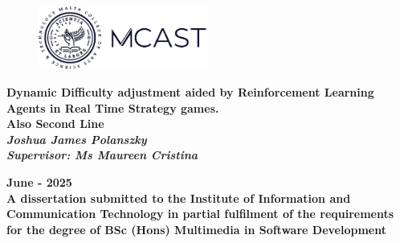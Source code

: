 \begin{titlepage}

\begin{figure}[h!]
\centering
\includegraphics[width=0.5\textwidth, right]{Figures/logo.png}
\caption*{}
\label{fig:entropy} 
\end{figure}

\vspace{0.5in}

\centering
\Huge{\textbf{Dynamic Difficulty adjustment aided by Reinforcement Learning Agents in Real Time Strategy games. \\Also Second Line}}\\[2.0in]

\large{\textit{\textbf{Joshua James Polanszky}}} \\[0.2in]
\large{\textit{\textbf{Supervisor: Ms Maureen Cristina}}} \\[0.8in]

\vspace{1.5in}

\normalsize{\textbf{June - 2025}}\\[0.2in]

\normalsize{\textbf{A dissertation submitted to the Institute of Information and Communication Technology in partial fulfilment of
the requirements for the degree of BSc (Hons) Multimedia in Software Development}}\\[0.2in]


\end{titlepage}
\newpage
